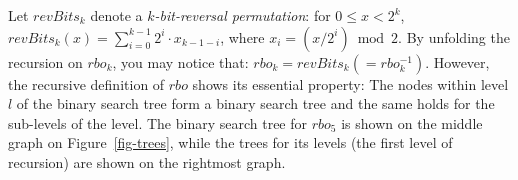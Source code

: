 \documentclass{llncs}
\begin{document}
Let $revBits_k$ denote a {\em $k$-bit-reversal permutation}:
  for $0 \le x < 2^k$,  
  $revBits_k (x) = \sum_{i = 0}^{k -1} 2^i \cdot x_{k - 1 - i}$, where $x_i = (x / 2^i) \bmod 2$.
By unfolding the recursion on $rbo_k$,
you may notice that:
  $rbo_k = revBits_k (= rbo_k^{- 1})$. 
However, the recursive definition of $rbo$ shows its essential property:
The nodes within level $l$ of the binary search tree form a binary search tree and
the same holds for the sub-levels of the level.
The binary search tree for $rbo_5$ is shown on the middle graph on Figure~\ref{fig-trees},
while the trees for its levels (the first level of recursion) are shown on the rightmost graph.


\begin{figure}
\end{figure}
\end{document}
